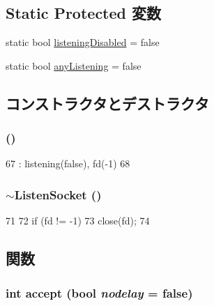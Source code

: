 \subsection*{Static Protected 変数}
\begin{DoxyCompactItemize}
\item 
static bool \hyperlink{classListenSocket_a14090a905e7feb385e20d56ab2941384}{listeningDisabled} = false
\item 
static bool \hyperlink{classListenSocket_aebef6e518aa8b11bc3b9b850cb6051a6}{anyListening} = false
\end{DoxyCompactItemize}


\subsection{コンストラクタとデストラクタ}
\hypertarget{classListenSocket_a34502b1f4b90c3f0fcd713cccebbd5fa}{
\subsubsection[{ListenSocket}]{ ()}}
\label{classListenSocket_a34502b1f4b90c3f0fcd713cccebbd5fa}



\begin{DoxyCode}
67     : listening(false), fd(-1)
68 {}
\end{DoxyCode}
\hypertarget{classListenSocket_ad0bf1771782f4882ca89a9c9d3e5f8c6}{
\subsubsection[{$\sim$ListenSocket}]{\setlength{\rightskip}{0pt plus 5cm}$\sim${\bf ListenSocket} ()}}
\label{classListenSocket_ad0bf1771782f4882ca89a9c9d3e5f8c6}



\begin{DoxyCode}
71 {
72     if (fd != -1)
73         close(fd);
74 }
\end{DoxyCode}


\subsection{関数}
\hypertarget{classListenSocket_a456b2a8397007045eca1f89d086b5778}{
\subsubsection[{accept}]{\setlength{\rightskip}{0pt plus 5cm}int accept (bool {\em nodelay} = {\ttfamily false})}}
\label{classListenSocket_a456b2a8397007045eca1f89d086b5778}



